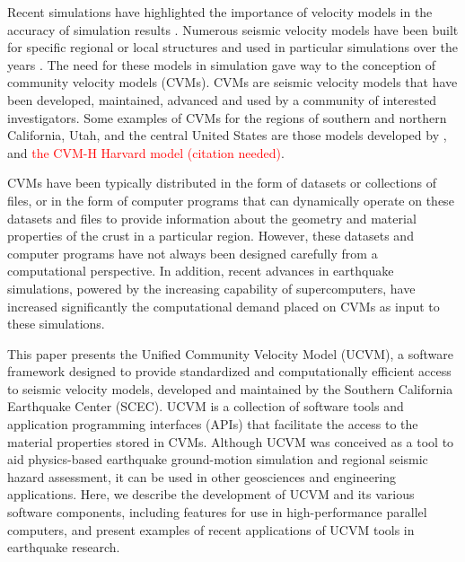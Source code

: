 Recent simulations have highlighted the importance of velocity models in the accuracy of simulation results \citep[e.g.,][]{Taborda_2014_BSSA}. Numerous seismic velocity models have been built for specific regional or local structures and used in particular simulations over the years \citep[e.g.,][]{Frankel_1992_BSSA, Brocher_2008_BSSA, Graves_2008_BSSA}. The need for these models in simulation gave way to the conception of community velocity models (CVMs). CVMs are seismic velocity models that have been developed, maintained, advanced and used by a community of interested investigators. Some examples of CVMs for the regions of southern and northern California, Utah, and the central United States are those models developed by \citet{Kohler_2003_BSSA, Brocher_2006_Proc, Magistrale_2006_Tech} \citet{RamirezGuzman_2012_BSSA}, and \textcolor{red}{the CVM-H Harvard model (citation needed)}. 

CVMs have been typically distributed in the form of datasets or collections of files, or in the form of computer programs that can dynamically operate on these datasets and files to provide information about the geometry and material properties of the crust in a particular region. However, these datasets and computer programs have not always been designed carefully from a computational perspective. In addition, recent advances in earthquake simulations, powered by the increasing capability of supercomputers, have increased significantly the computational demand placed on CVMs as input to these simulations. 

This paper presents the Unified Community Velocity Model (UCVM), a software framework designed to provide standardized and computationally efficient access to seismic velocity models, developed and maintained by the Southern California Earthquake Center (SCEC). UCVM is a collection of software tools and application programming interfaces (APIs) that facilitate the access to the material properties stored in CVMs. Although UCVM was conceived as a tool to aid physics-based earthquake ground-motion simulation and regional seismic hazard assessment, it can be used in other geosciences and engineering applications. Here, we describe the development of UCVM and its various software components, including features for use in high-performance parallel computers, and present examples of recent applications of UCVM tools in earthquake research.

